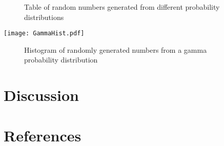 \documentclass[12pt, letterpaper, twoside]{article}\usepackage[]{graphicx}\usepackage[]{xcolor}
\begin{document}
\begin{figure}[h]
  \centering
  \caption{Table of random numbers generated from different probability distributions}
  \label{fig:Random Variable Table}
\end{figure}

\texttt{[image: GammaHist.pdf]}

\begin{figure}[h]
  \centering
  \caption{Histogram of randomly generated numbers from a gamma probability distribution}
  \label{fig:Random Gamma Histogram}
\end{figure}

\section*{Discussion}
\lipsum[-1]

\section*{References}
\lipsum[7]
\end{document}
